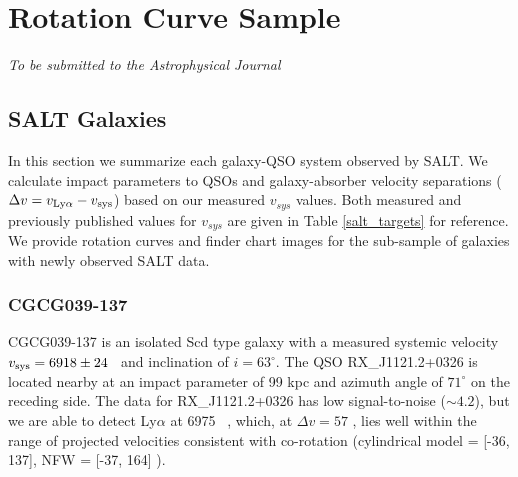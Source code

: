 \chapter[Rotation Curve Sample]{Rotation Curve Sample}
\label{chap:chap4}


\vfill

\begin{flushright}
  \fixspacing %
  \textit{To be submitted to the \emph{Astrophysical Journal}} \\
\end{flushright}

\vspace*{1in} %

\cleardoublepage


\section{SALT Galaxies} \label{SALT_sample}
In this section we summarize each galaxy-QSO system observed by SALT. We calculate impact parameters to QSOs and galaxy-absorber velocity separations ($\Delta v = v_{\rm Ly\alpha} - v_{\rm sys}$) based on our measured $v_{sys}$ values. Both measured and previously published values for $v_{sys}$ are given in Table \ref{salt_targets} for reference. We provide rotation curves and finder chart images for the sub-sample of galaxies with newly observed SALT data.

\subsection{CGCG039-137}
CGCG039-137 is an isolated Scd type galaxy with a measured systemic velocity $v_{\rm sys} = 6918 \pm 24$ \kms~and inclination of $i = 63^{\circ}$. The QSO RX\_J1121.2+0326 is located nearby at an impact parameter of 99 kpc and azimuth angle of $71^{\circ}$ on the receding side. The data for  RX\_J1121.2+0326 has low signal-to-noise ($\sim 4.2$), but we are able to detect Ly$\alpha$ at 6975 \kms~, which, at $\Delta v = 57$ \kms, lies well within the range of projected velocities consistent with co-rotation (cylindrical model = [-36, 137], NFW = [-37, 164] \kms). 

